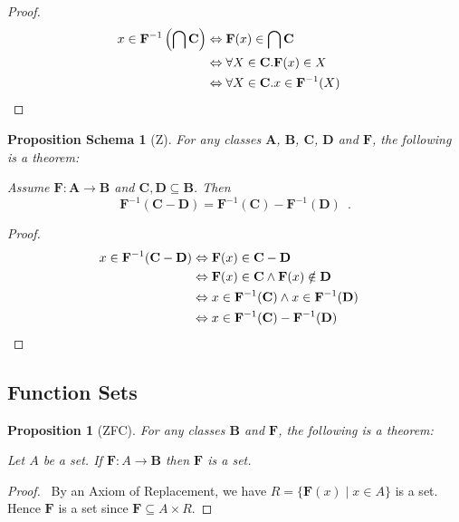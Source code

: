 \documentclass{book}
\let\qed\relax
\newtheorem{prop}[ax]{Proposition}
\newtheorem{props}[ax]{Proposition Schema}
\theoremstyle{definition}
\begin{document}
\begin{proof}
\pf
\begin{align*}
x \in \mathbf{F}^{-1} \left( \bigcap \mathbf{C} \right)
& \Leftrightarrow \mathbf{F}(x) \in \bigcap \mathbf{C} \\
& \Leftrightarrow \forall X \in \mathbf{C}. \mathbf{F}(x) \in X \\
& \Leftrightarrow \forall X \in \mathbf{C}. x \in \mathbf{F}^{-1}(X) & \qed
\end{align*}
\end{proof}

\begin{props}[Z]
For any classes $\mathbf{A}$, $\mathbf{B}$, $\mathbf{C}$, $\mathbf{D}$ and $\mathbf{F}$, the following is a theorem:

Assume $\mathbf{F} : \mathbf{A} \rightarrow \mathbf{B}$ and $\mathbf{C}, \mathbf{D} \subseteq \mathbf{B}$. Then
\[ \mathbf{F}^{-1}(\mathbf{C} - \mathbf{D}) = \mathbf{F}^{-1}(\mathbf{C}) - \mathbf{F}^{-1}(\mathbf{D}) \enspace . \]
\end{props}

\begin{proof}
\pf
\begin{align*}
x \in \mathbf{F}^{-1}(\mathbf{C} - \mathbf{D}) & \Leftrightarrow \mathbf{F}(x) \in \mathbf{C} - \mathbf{D} \\
& \Leftrightarrow \mathbf{F}(x) \in \mathbf{C} \wedge \mathbf{F}(x) \notin \mathbf{D} \\
& \Leftrightarrow x \in \mathbf{F}^{-1}(\mathbf{C}) \wedge x \in \mathbf{F}^{-1}(\mathbf{D}) \\
& \Leftrightarrow x \in \mathbf{F}^{-1}(\mathbf{C}) - \mathbf{F}^{-1}(\mathbf{D}) & \qed
\end{align*}
\end{proof}

\subsection{Function Sets}

\begin{prop}[ZFC]
For any classes $\mathbf{B}$ and $\mathbf{F}$, the following is a theorem:

Let $A$ be a set. If $\mathbf{F} : A \rightarrow \mathbf{B}$ then $\mathbf{F}$ is a set.
\end{prop}

\begin{proof}
\pf\ By an Axiom of Replacement, we have $R = \{ \mathbf{F}(x) \mid x \in A \}$ is a set. Hence $\mathbf{F}$ is a set since $\mathbf{F} \subseteq A \times R$. \qed
\end{proof}
\end{document}
